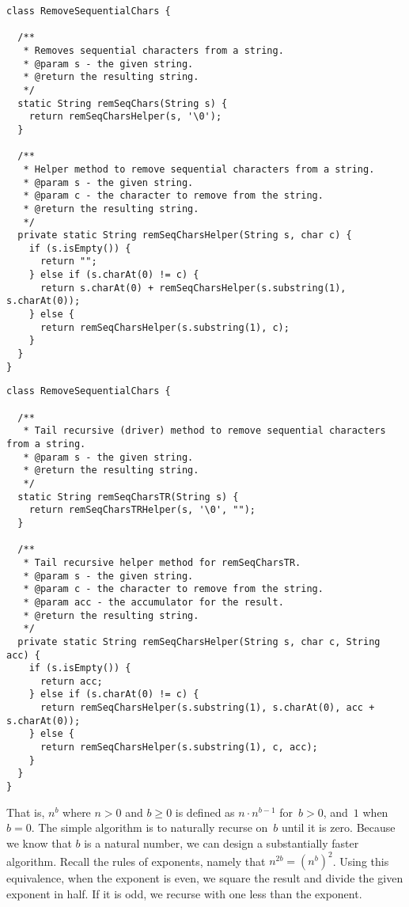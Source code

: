 \begin{lstlisting}[language=MyJava]
class RemoveSequentialChars {

  /**
   * Removes sequential characters from a string.
   * @param s - the given string.
   * @return the resulting string.
   */
  static String remSeqChars(String s) {
    return remSeqCharsHelper(s, '\0');
  }

  /**
   * Helper method to remove sequential characters from a string.
   * @param s - the given string.
   * @param c - the character to remove from the string.
   * @return the resulting string.
   */
  private static String remSeqCharsHelper(String s, char c) {
    if (s.isEmpty()) {
      return "";
    } else if (s.charAt(0) != c) {
      return s.charAt(0) + remSeqCharsHelper(s.substring(1), s.charAt(0));
    } else {
      return remSeqCharsHelper(s.substring(1), c);
    }
  }
}
\end{lstlisting}

\begin{lstlisting}[language=MyJava]
class RemoveSequentialChars {

  /**
   * Tail recursive (driver) method to remove sequential characters from a string.
   * @param s - the given string.
   * @return the resulting string.
   */
  static String remSeqCharsTR(String s) {
    return remSeqCharsTRHelper(s, '\0', "");
  }

  /**
   * Tail recursive helper method for remSeqCharsTR.
   * @param s - the given string.
   * @param c - the character to remove from the string.
   * @param acc - the accumulator for the result.
   * @return the resulting string.
   */
  private static String remSeqCharsHelper(String s, char c, String acc) {
    if (s.isEmpty()) {
      return acc;
    } else if (s.charAt(0) != c) {
      return remSeqCharsHelper(s.substring(1), s.charAt(0), acc + s.charAt(0));
    } else {
      return remSeqCharsHelper(s.substring(1), c, acc);
    }
  }
}
\end{lstlisting}

That is, $n^b$ where $n > 0$ and $b \geq 0$ is defined as $n \cdot n^{b-1}$ for~$b > 0$, and~$1$ when~$b=0$.
The simple algorithm is to naturally recurse on~$b$ until it is zero. 
Because we know that $b$ is a natural number, we can design a substantially faster algorithm.
Recall the rules of exponents, namely that $n^{2b} = (n^b)^2$. 
Using this equivalence, when the exponent is even, we square the result and divide the given exponent in half.
If it is odd, we recurse with one less than the exponent.

